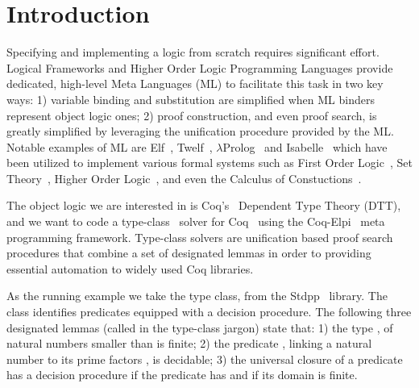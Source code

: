 \documentclass[sigconf,natbib=false]{acmart}
\begin{document}

\maketitle

\section{Introduction}
\label{sec:intro}

Specifying and implementing a logic from scratch requires significant effort.
Logical Frameworks and Higher Order Logic Programming Languages provide
dedicated, high-level Meta Languages (ML) to facilitate this task in two
key ways: 1) variable binding and substitution are simplified when ML binders
represent object logic ones; 2) proof construction, and even proof search, is
greatly simplified by leveraging the unification procedure provided by the ML.
Notable examples of ML are Elf~\cite{elf}, Twelf~\cite{twelf},
$\lambda$Prolog~\cite{miller_nadathur_2012} and
Isabelle~\cite{10.1007/978-3-540-71067-7_7}
which have been utilized to implement various formal systems such as
First Order Logic~\cite{felty88cade},
Set Theory~\cite{10.1007/BF00881873},
Higher Order Logic~\cite{books/sp/NipkowPW02}, and even the Calculus of
Constuctions~\cite{felty93lics}.

The object logic we are interested in is Coq's~\cite{Coq-refman}
Dependent Type Theory (DTT), and we want to code a type-class~\cite{wadler89}
solver for Coq~\cite{Coq-refman} using the Coq-Elpi~\cite{tassi:hal-01637063}
meta programming framework.
Type-class solvers are unification based proof search procedures
that combine a set of designated lemmas in order to providing essential
automation to widely used Coq libraries.

As the running example we take the  type class,
from the Stdpp~\cite{JUNG_KREBBERS_JOURDAN_BIZJAK_BIRKEDAL_DREYER_2018}
library. The class identifies predicates equipped with a decision procedure.
The following three designated lemmas (called  in the
type-class jargon) state that: 1) the type , of natural numbers
smaller than  is finite; 2) the predicate ,
linking a natural number  to its prime factors , is decidable;
3) the universal closure of a predicate has a decision procedure if the
predicate has and if its domain is finite.
\end{document}
